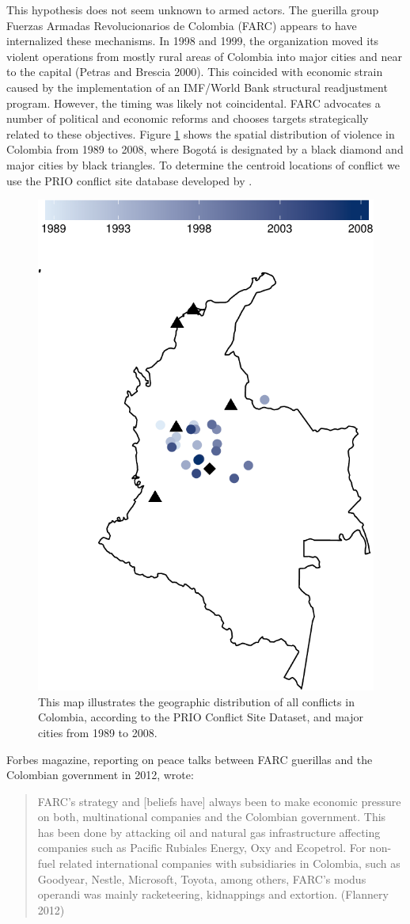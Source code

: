 This hypothesis does not seem unknown to armed actors. The guerilla group Fuerzas Armadas Revolucionarios de Colombia (FARC) appears to have internalized these mechanisms. In 1998 and 1999, the organization moved its violent operations from mostly rural areas of Colombia into major cities and near to the capital (Petras and Brescia 2000). This coincided with economic strain caused by the implementation of an IMF/World Bank structural readjustment program. However, the timing was likely not coincidental. FARC advocates a number of political and economic reforms and chooses targets strategically related to these objectives. Figure \ref{fig:columbiaMap} shows the spatial distribution of violence in Colombia from 1989 to 2008, where Bogot\'{a} is designated by a black diamond and major cities by black triangles. To determine the centroid locations of conflict we use the PRIO conflict site database developed by \citet{hallberg:2012}. 

\begin{figure}[ht]
	\centering
	\includegraphics[width=.5\textwidth]{colombiaMap-crop}
	\caption{This map illustrates the geographic distribution of all conflicts in Colombia, according to the PRIO Conflict Site Dataset, and major cities from 1989 to 2008.}
	\label{fig:columbiaMap}
\end{figure}

Forbes magazine, reporting on peace talks between FARC guerillas and the Colombian government in 2012, wrote: 

\begin{quote}
	FARC's strategy and [beliefs have] always been to make economic pressure on both, multinational companies and the Colombian government. This has been done by attacking oil and natural gas infrastructure affecting companies such as Pacific Rubiales Energy, Oxy and Ecopetrol. For non-fuel related international companies with subsidiaries in Colombia, such as Goodyear, Nestle, Microsoft, Toyota, among others, FARC’s modus operandi was mainly racketeering, kidnappings and extortion. (Flannery 2012)
\end{quote}


